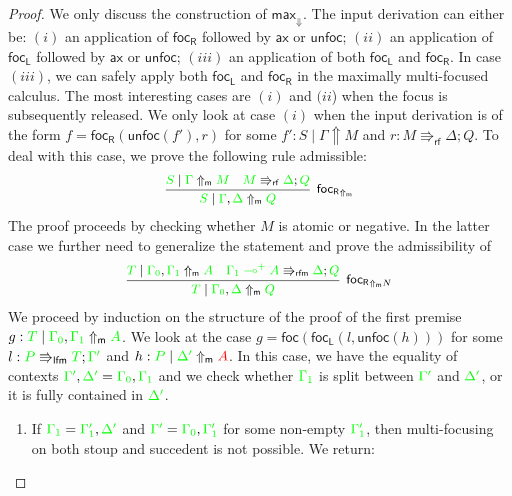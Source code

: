 \documentclass[runningheads]{llncs}
\newcommand{\ax}{\mathsf{ax}}
\newcommand{\lolli}{\multimap}
\newcommand{\lfm}{\Rrightarrow_\mathsf{lfm}}
\newcommand{\rfm}{\Rrightarrow_\mathsf{rfm}}
\newcommand{\rf}{\Rrightarrow_\mathsf{rf}}
\newcommand{\proofbox}[1]{\begin{tabular}{l} #1 \end{tabular}}
\newcommand{\red}[1]{{\color{red}#1}}
\newcommand{\green}[1]{{\color{green}#1}}
\newcommand{\up}{\Uparrow}
\newcommand{\dn}{\Downarrow}
\newcommand{\upm}{\Uparrow_{\mathsf{m}}}
\newcommand{\focL}{\mathsf{foc_L}}
\newcommand{\foc}{\mathsf{foc}}
\newcommand{\focR}{\mathsf{foc_R}}
\newcommand{\unfoc}{\mathsf{unfoc}}
\begin{document}
\begin{proof}
  We only discuss the construction of $\mathsf{max}_\dn$. The input derivation can either be: $(i)$ an application of $\focR$ followed by $\ax$ or $\unfoc$; $(ii)$ an application of $\focL$ followed by $\ax$ or $\unfoc$; $(iii)$ an application of both $\focL$ and $\focR$. In case $(iii)$, we can safely apply both $\focL$ and $\focR$ in the maximally multi-focused calculus. The most interesting cases are $(i)$ and $(ii$) when the focus is subsequently released. We only look at case $(i)$ when the input derivation is of the form $f = \focR(\unfoc(f'),r)$ for some $f' : S \mid \Gamma \up M$ and $r : M \rf \Delta ; Q$. To deal with this case, we prove the following rule admissible:%
  \begin{equation*}\label{eq:otmax}
    \small
    \proofbox{
    \infer[\focR_{\upm}]{\green{S} \mid \green{\Gamma},\green{\Delta} \upm \green{Q}}{
      \green{S} \mid \green{\Gamma} \upm \green{M}
      &
      \green{M} \rf \green{\Delta} ; \green{Q}
    }
    }
  \end{equation*}
  The proof proceeds by checking whether $M$ is atomic or negative. In the latter case we further need to generalize the statement and prove the admissibility of
  \begin{equation*}\label{eq:otmaxneg}
    \small
    \proofbox{
    \infer[\focR_{\upm N}]{\green{T} \mid \green{\Gamma_0},\green{\Delta} \upm \green{Q}}{
      \green{T} \mid \green{\Gamma_0},\green{\Gamma_1} \upm \green{A}
      &
      \green{\green{\Gamma_1} \lolli^+ A} \rfm \green{\Delta} ; \green{Q}
    }
    }
  \end{equation*}
  We proceed by induction on the structure of the proof of the first premise $g : \green{T} \mid \green{\Gamma_0},\green{\Gamma_1} \upm \green{A}$. We look at the case $g = \foc(\focL(l,\unfoc(h)))$ for some $l : \green{P} \lfm \green{T} ; \green{\Gamma'}$ and $h : \green{P} \mid \green{\Delta'} \upm \red{A}$. In this case, we have the equality of contexts $\green{\Gamma'},\green{\Delta'} = \green{\Gamma_0},\green{\Gamma_1}$ and we check whether $\green{\Gamma_1}$ is split between $\green{\Gamma'}$ and $\green{\Delta'}$, or it is fully contained in $\green{\Delta'}$.
  \begin{enumerate}
  \item If $\green{\Gamma_1} = \green{\Gamma_{1}'},\green{\Delta'}$ and $\green{\Gamma'} =\green{\Gamma_0},\green{\Gamma_{1}'}$ for some non-empty $\green{\Gamma_{1}'}$, then multi-focusing on both stoup and succedent is not possible. We return:

\end{enumerate}
\end{proof}
\end{document}
